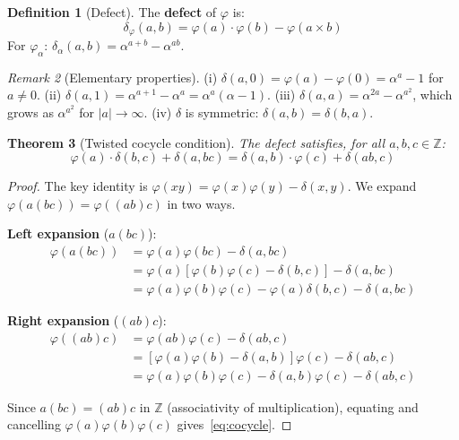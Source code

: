 \documentclass[11pt,a4paper]{article}
\theoremstyle{plain}
\newtheorem{theorem}{Theorem}[section]
\theoremstyle{definition}
\newtheorem{definition}[theorem]{Definition}
\theoremstyle{remark}
\newtheorem{remark}[theorem]{Remark}
\newcommand{\ZZ}{\mathbb{Z}}
\begin{document}
\begin{definition}[Defect]
\label{def:defect}
The \textbf{defect} of $\varphi$ is:
\begin{equation}
\delta_\varphi(a, b) = \varphi(a) \cdot \varphi(b) - \varphi(a \times b)
\label{eq:defect}
\end{equation}
For $\varphi_\alpha$: $\delta_\alpha(a,b) = \alpha^{a+b} - \alpha^{ab}$.
\end{definition}

\begin{remark}[Elementary properties]
\label{rem:elementary}
(i) $\delta(a, 0) = \varphi(a) - \varphi(0) = \alpha^a - 1$ for 
$a \neq 0$. (ii) $\delta(a, 1) = \alpha^{a+1} - \alpha^a = 
\alpha^a(\alpha - 1)$. (iii) $\delta(a, a) = \alpha^{2a} - 
\alpha^{a^2}$, which grows as $\alpha^{a^2}$ for $|a| \to \infty$. 
(iv) $\delta$ is symmetric: $\delta(a,b) = \delta(b,a)$.
\end{remark}

\begin{theorem}[Twisted cocycle condition]
\label{thm:cocycle}
The defect satisfies, for all $a, b, c \in \ZZ$:
\begin{equation}
\boxed{\varphi(a) \cdot \delta(b, c) + \delta(a, bc) = 
\delta(a, b) \cdot \varphi(c) + \delta(ab, c)}
\label{eq:cocycle}
\end{equation}
\end{theorem}

\begin{proof}
The key identity is $\varphi(xy) = \varphi(x)\varphi(y) - \delta(x,y)$. 
We expand $\varphi(a(bc)) = \varphi((ab)c)$ in two ways.

\textbf{Left expansion} ($a(bc)$):
\begin{align*}
\varphi(a(bc)) &= \varphi(a)\varphi(bc) - \delta(a, bc) \\
&= \varphi(a)[\varphi(b)\varphi(c) - \delta(b,c)] - \delta(a, bc) \\
&= \varphi(a)\varphi(b)\varphi(c) - \varphi(a)\delta(b,c) - \delta(a, bc)
\end{align*}

\textbf{Right expansion} ($(ab)c$):
\begin{align*}
\varphi((ab)c) &= \varphi(ab)\varphi(c) - \delta(ab, c) \\
&= [\varphi(a)\varphi(b) - \delta(a,b)]\varphi(c) - \delta(ab, c) \\
&= \varphi(a)\varphi(b)\varphi(c) - \delta(a,b)\varphi(c) - \delta(ab, c)
\end{align*}

Since $a(bc) = (ab)c$ in $\ZZ$ (associativity of multiplication), 
equating and cancelling $\varphi(a)\varphi(b)\varphi(c)$ 
gives~\eqref{eq:cocycle}.
\end{proof}
\end{document}
